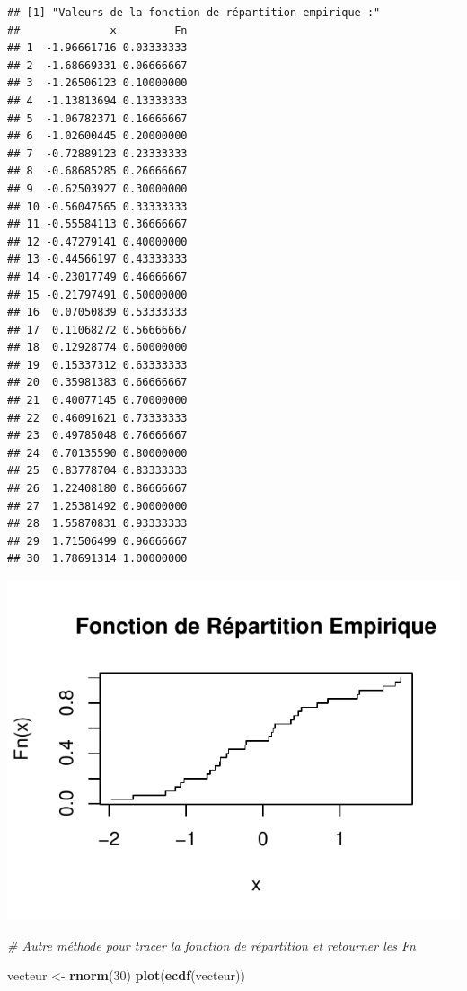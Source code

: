 \documentclass[
  12pt,
]{article}
\newenvironment{Shaded}{\begin{snugshade}}{\end{snugshade}}
\newcommand{\CommentTok}[1]{\textcolor[rgb]{0.56,0.35,0.01}{\textit{#1}}}
\newcommand{\DecValTok}[1]{\textcolor[rgb]{0.00,0.00,0.81}{#1}}
\newcommand{\FunctionTok}[1]{\textcolor[rgb]{0.13,0.29,0.53}{\textbf{#1}}}
\newcommand{\NormalTok}[1]{#1}
\newcommand{\OtherTok}[1]{\textcolor[rgb]{0.56,0.35,0.01}{#1}}
\begin{document}
\begin{verbatim}
## [1] "Valeurs de la fonction de répartition empirique :"
##              x         Fn
## 1  -1.96661716 0.03333333
## 2  -1.68669331 0.06666667
## 3  -1.26506123 0.10000000
## 4  -1.13813694 0.13333333
## 5  -1.06782371 0.16666667
## 6  -1.02600445 0.20000000
## 7  -0.72889123 0.23333333
## 8  -0.68685285 0.26666667
## 9  -0.62503927 0.30000000
## 10 -0.56047565 0.33333333
## 11 -0.55584113 0.36666667
## 12 -0.47279141 0.40000000
## 13 -0.44566197 0.43333333
## 14 -0.23017749 0.46666667
## 15 -0.21797491 0.50000000
## 16  0.07050839 0.53333333
## 17  0.11068272 0.56666667
## 18  0.12928774 0.60000000
## 19  0.15337312 0.63333333
## 20  0.35981383 0.66666667
## 21  0.40077145 0.70000000
## 22  0.46091621 0.73333333
## 23  0.49785048 0.76666667
## 24  0.70135590 0.80000000
## 25  0.83778704 0.83333333
## 26  1.22408180 0.86666667
## 27  1.25381492 0.90000000
## 28  1.55870831 0.93333333
## 29  1.71506499 0.96666667
## 30  1.78691314 1.00000000
\end{verbatim}

\includegraphics[width=0.8\linewidth]{Stat_non_para_files/figure-latex/unnamed-chunk-13-1}

\begin{Shaded}
\begin{Highlighting}[]
\CommentTok{\# Autre méthode pour tracer la fonction de répartition  et retourner les Fn}

\NormalTok{vecteur }\OtherTok{\textless{}{-}} \FunctionTok{rnorm}\NormalTok{(}\DecValTok{30}\NormalTok{)  }
\FunctionTok{plot}\NormalTok{(}\FunctionTok{ecdf}\NormalTok{(vecteur))}
\end{Highlighting}
\end{Shaded}
\end{document}
